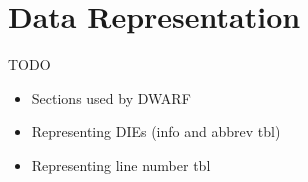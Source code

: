 
\section{Data Representation}


\begin{frame}{TODO}
\begin{itemize}
\item Sections used by DWARF
\item Representing DIEs (info and abbrev tbl)
\item Representing line number tbl
\end{itemize}
\end{frame}
